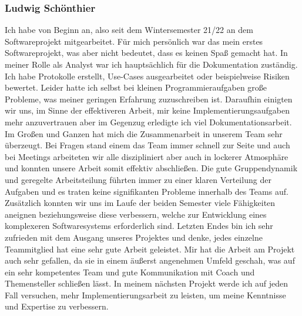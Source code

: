 \documentclass[10pt]{article}
\begin{document}
\subsubsection{Ludwig Schönthier}
    Ich habe von Beginn an, also seit dem Wintersemester 21/22 an dem Softwareprojekt mitgearbeitet. Für mich persönlich war das mein erstes Softwareprojekt,
    was aber nicht bedeutet, dass es keinen Spaß gemacht hat. In meiner Rolle als Analyst war ich hauptsächlich für die Dokumentation zuständig. Ich habe Protokolle
    erstellt, Use-Cases ausgearbeitet oder beispielweise Risiken bewertet. Leider hatte ich selbst bei kleinen Programmieraufgaben große Probleme, was meiner geringen
    Erfahrung zuzuschreiben ist. Daraufhin einigten wir uns, im Sinne der effektiveren Arbeit, mir keine Implementierungsaufgaben mehr anzuvertrauen aber im Gegenzug
    erledigte ich viel Dokumentationsarbeit.
    Im Großen und Ganzen hat mich die Zusammenarbeit in unserem Team sehr überzeugt. Bei Fragen stand einem das Team immer schnell zur Seite und auch bei Meetings
    arbeiteten wir alle diszipliniert aber auch in lockerer Atmosphäre und konnten unsere Arbeit somit effektiv abschließen. Die gute Gruppendynamik und geregelte
    Arbeitsteilung führten immer zu einer klaren Verteilung der Aufgaben und es traten keine signifikanten Probleme innerhalb des Teams auf. Zusätzlich konnten wir uns
    im Laufe der beiden Semester viele Fähigkeiten aneignen beziehungsweise diese verbessern, welche zur Entwicklung eines komplexeren Softwaresystems erforderlich sind.
        Letzten Endes bin ich sehr zufrieden mit dem Ausgang unseres Projektes und denke, jedes einzelne Teammitglied hat eine sehr gute Arbeit geleistet. Mir hat die
    Arbeit am Projekt auch sehr gefallen, da sie in einem äußerst angenehmen Umfeld geschah, was auf ein sehr kompetentes Team und gute Kommunikation mit Coach und
    Themensteller schließen lässt. In meinem nächsten Projekt werde ich auf jeden Fall versuchen, mehr Implementierungsarbeit zu leisten, um meine Kenntnisse und
    Expertise zu verbessern.

\newpage
\end{document}
